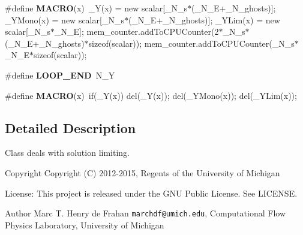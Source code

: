 \begin{DoxyCompactItemize}
\item 
\#define {\bfseries M\-A\-C\-R\-O}(x)~\-\_\-\-Y(x) = new scalar[\-\_\-\-N\-\_\-s$\ast$(\-\_\-\-N\-\_\-\-E+\-\_\-\-N\-\_\-ghosts)]; \-\_\-\-Y\-Mono(x) = new scalar[\-\_\-\-N\-\_\-s$\ast$(\-\_\-\-N\-\_\-\-E+\-\_\-\-N\-\_\-ghosts)]; \-\_\-\-Y\-Lim(x) = new scalar[\-\_\-\-N\-\_\-s$\ast$\-\_\-\-N\-\_\-\-E];  mem\-\_\-counter.\-add\-To\-C\-P\-U\-Counter(2$\ast$\-\_\-\-N\-\_\-s$\ast$(\-\_\-\-N\-\_\-\-E+\-\_\-\-N\-\_\-ghosts)$\ast$sizeof(scalar)); mem\-\_\-counter.\-add\-To\-C\-P\-U\-Counter(\-\_\-\-N\-\_\-s$\ast$\-\_\-\-N\-\_\-\-E$\ast$sizeof(scalar));\label{limiting_8h_a5de1a5f1c0cf262e0ff2e5f03d586abc}

\item 
\#define {\bfseries L\-O\-O\-P\-\_\-\-E\-N\-D}~N\-\_\-\-Y\label{limiting_8h_aa475ffaee4695d0cbfb87c71fc1642eb}

\item 
\#define {\bfseries M\-A\-C\-R\-O}(x)~if(\-\_\-\-Y(x)) del(\-\_\-\-Y(x)); del(\-\_\-\-Y\-Mono(x)); del(\-\_\-\-Y\-Lim(x));\label{limiting_8h_a5de1a5f1c0cf262e0ff2e5f03d586abc}

\end{DoxyCompactItemize}


\subsection{Detailed Description}
Class deals with solution limiting. \begin{DoxyCopyright}{Copyright}
Copyright (C) 2012-\/2015, Regents of the University of Michigan 
\end{DoxyCopyright}
\begin{DoxyParagraph}{License\-:}
This project is released under the G\-N\-U Public License. See L\-I\-C\-E\-N\-S\-E. 
\end{DoxyParagraph}
\begin{DoxyAuthor}{Author}
Marc T. Henry de Frahan {\tt marchdf@umich.\-edu}, Computational Flow Physics Laboratory, University of Michigan 
\end{DoxyAuthor}
